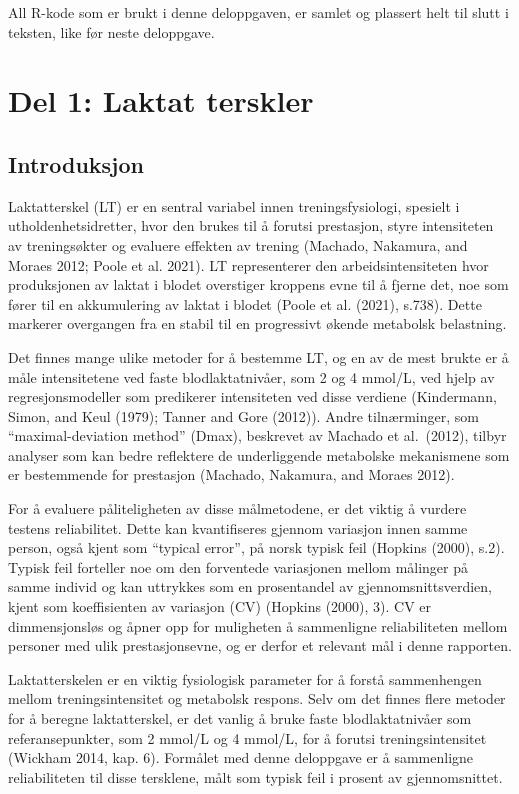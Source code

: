 \documentclass[
  letterpaper,
  DIV=11,
  numbers=noendperiod]{scrreprt}
\begin{document}
All R-kode som er brukt i denne deloppgaven, er samlet og plassert helt
til slutt i teksten, like før neste deloppgave.

\section{Del 1: Laktat terskler}\label{del-1-laktat-terskler}

\subsection{Introduksjon}\label{introduksjon-1}

Laktatterskel (LT) er en sentral variabel innen treningsfysiologi,
spesielt i utholdenhetsidretter, hvor den brukes til å forutsi
prestasjon, styre intensiteten av treningsøkter og evaluere effekten av
trening (Machado, Nakamura, and Moraes 2012; Poole et al. 2021). LT
representerer den arbeidsintensiteten hvor produksjonen av laktat i
blodet overstiger kroppens evne til å fjerne det, noe som fører til en
akkumulering av laktat i blodet (Poole et al. (2021), s.738). Dette
markerer overgangen fra en stabil til en progressivt økende metabolsk
belastning.

Det finnes mange ulike metoder for å bestemme LT, og en av de mest
brukte er å måle intensitetene ved faste blodlaktatnivåer, som 2 og 4
mmol/L, ved hjelp av regresjonsmodeller som predikerer intensiteten ved
disse verdiene (Kindermann, Simon, and Keul (1979); Tanner and Gore
(2012)). Andre tilnærminger, som ``maximal-deviation method'' (Dmax),
beskrevet av Machado et al.~(2012), tilbyr analyser som kan bedre
reflektere de underliggende metabolske mekanismene som er bestemmende
for prestasjon (Machado, Nakamura, and Moraes 2012).

For å evaluere påliteligheten av disse målmetodene, er det viktig å
vurdere testens reliabilitet. Dette kan kvantifiseres gjennom variasjon
innen samme person, også kjent som ``typical error'', på norsk typisk
feil (Hopkins (2000), s.2). Typisk feil forteller noe om den forventede
variasjonen mellom målinger på samme individ og kan uttrykkes som en
prosentandel av gjennomsnittsverdien, kjent som koeffisienten av
variasjon (CV) (Hopkins (2000), 3). CV er dimmensjonsløs og åpner opp
for muligheten å sammenligne reliabiliteten mellom personer med ulik
prestasjonsevne, og er derfor et relevant mål i denne rapporten.

Laktatterskelen er en viktig fysiologisk parameter for å forstå
sammenhengen mellom treningsintensitet og metabolsk respons. Selv om det
finnes flere metoder for å beregne laktatterskel, er det vanlig å bruke
faste blodlaktatnivåer som referansepunkter, som 2 mmol/L og 4 mmol/L,
for å forutsi treningsintensitet (Wickham 2014, kap. 6). Formålet med
denne deloppgave er å sammenligne reliabiliteten til disse tersklene,
målt som typisk feil i prosent av gjennomsnittet.
\end{document}
